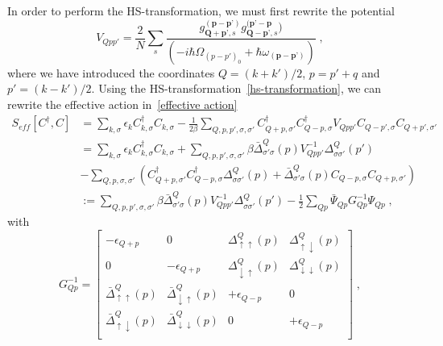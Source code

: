 \documentclass{article}
\begin{document}
In order to perform the HS-transformation, we must first rewrite the potential 
\begin{equation}
    V_{Qpp'} = \frac{2}{N} \sum_s \frac{g_{\textbf{Q} + \textbf{p'},s}^{(\textbf{p} - \textbf{p'})} g_{\textbf{Q} - \textbf{p'},s}^{(\textbf{p'} - \textbf{p}})}{\left(-i\hbar\Omega_{(p-p')_0} + \hbar \omega_{(\textbf{p} - \textbf{p'})}\right)}\;,
    \label{potential in new coordinates}
\end{equation}
where we have introduced the coordinates $Q = (k + k') / 2 $, $p = p' + q$ and $p' = (k - k')/2$. Using the HS-transformation~\cref{hs-transformation}, we can rewrite the effective action in~\cref{effective action}
\begin{align}
S_{eff}[C^{\dagger},C] &= \sum_{k,\sigma} \epsilon_k C^{\dagger}_{k,\sigma} C_{k,\sigma} -  \frac{1}{2\beta} \sum_{Q,p,p',\sigma,\sigma'} C^{\dagger}_{Q + p,\sigma'} C^{\dagger}_{Q - p,\sigma} V_{Q p p'} C_{Q - p',\sigma}  C_{Q + p',\sigma'}\label{effective action transformed}\\
                       &=  \sum_{k,\sigma} \epsilon_k C^{\dagger}_{k,\sigma} C_{k,\sigma} +  \sum_{Q,p,p',\sigma,\sigma'} \beta \bar{\Delta}^{Q}_{\sigma' \sigma}(p) V^{-1}_{Q p p'} \Delta^{Q}_{\sigma \sigma'}(p')\nonumber\\
                       &- \sum_{Q,p,\sigma,\sigma'}\left( C^{\dagger}_{Q + p,\sigma'} C^{\dagger}_{Q - p,\sigma} \Delta^{Q}_{\sigma \sigma'}(p)+ \bar{\Delta}^{Q}_{\sigma' \sigma}(p)  C_{Q - p,\sigma} C_{Q + p,\sigma'} \right)\nonumber\\
                       &:= \sum_{Q,p,p',\sigma,\sigma'} \beta \bar{\Delta}^{Q}_{\sigma' \sigma}(p) V^{-1}_{Q p p'} \Delta^{Q}_{\sigma \sigma'}(p') - \frac{1}{2} \sum_{Q p} \bar{\Psi}_{Q p} G^{-1}_ {Q p} \Psi_{Q p}\;,
\end{align}
with 
\begin{equation}
     G_{Q p}^{-1} = 
\begin{bmatrix}
-\epsilon_{Q + p} & 0                & \Delta^{Q}_{\uparrow \uparrow}(p) & \Delta^{Q}_{\uparrow \downarrow}(p) \\
         0       & -\epsilon_{Q + p} & \Delta^{Q}_{\downarrow \uparrow}(p) & \Delta^{Q}_{\downarrow \downarrow}(p) \\
         \bar{\Delta}^{Q}_{\uparrow \uparrow}(p)       & \bar{\Delta}^{Q}_{\downarrow \uparrow}(p)                & +\epsilon_{Q-p} & 0 \\
         \bar{\Delta}^{Q}_{\uparrow \downarrow }(p)       & \bar{\Delta}^{Q}_{\downarrow \downarrow}(p)                & 0               & +\epsilon_{Q-p} \\
\end{bmatrix}\;,
\end{equation}
\end{document}
